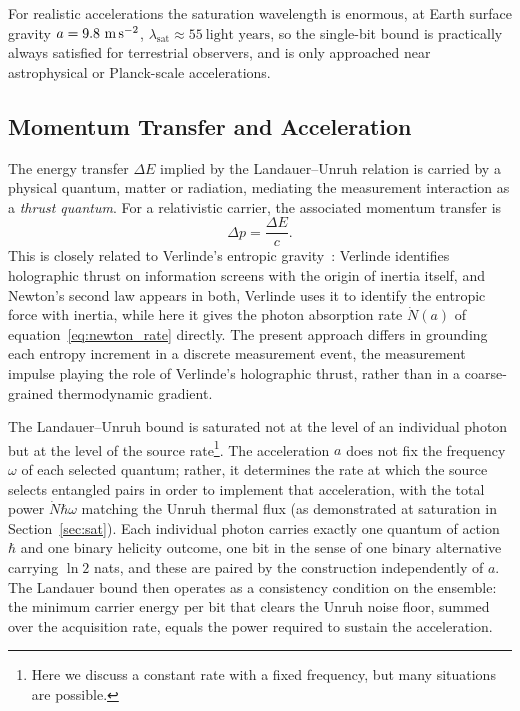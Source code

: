 \documentclass[12pt,a4paper]{article}
\begin{document}
For realistic accelerations the saturation wavelength is 
enormous, at Earth surface gravity $a = 9.8\ 
\text{m\,s}^{-2}$, $\lambda_{\text{sat}} \approx 55\ 
\text{light years}$, so the single-bit bound is 
practically always satisfied for terrestrial observers, 
and is only approached near astrophysical or Planck-scale 
accelerations.

\subsection{Momentum Transfer and Acceleration}
\label{sec:momentum}

The energy transfer $\Delta E$ implied by the 
Landauer--Unruh relation is carried by a physical 
quantum, matter or radiation, mediating the measurement 
interaction as a \emph{thrust quantum}. For a 
relativistic carrier, the associated momentum transfer is
%
\begin{equation}
\Delta p = \frac{\Delta E}{c}.
\end{equation}
%
This is closely related to Verlinde's entropic 
gravity~\cite{entropic}: Verlinde identifies holographic 
thrust on information screens with the origin of inertia 
itself, and Newton's second law appears in both,
Verlinde uses it to identify the entropic force with inertia, 
while here it gives the photon absorption rate 
$\dot{N}(a)$ of equation~\eqref{eq:newton_rate} directly.
The present approach differs in grounding 
each entropy increment in a discrete measurement event, 
the measurement impulse playing the role of Verlinde's 
holographic thrust, rather than in a coarse-grained 
thermodynamic gradient.

The Landauer--Unruh bound is saturated not at the level 
of an individual photon but at the level of the source 
rate\footnote{Here we discuss a constant rate with a 
fixed frequency, but many situations are possible.}. 
The acceleration $a$ does not fix the frequency $\omega$ 
of each selected quantum; rather, it determines the rate 
at which the source selects entangled pairs in order to 
implement that acceleration,
with the total power 
$\dot{N}\hbar\omega$ matching the Unruh thermal flux 
(as demonstrated at saturation in Section~\ref{sec:sat}).
Each individual photon carries exactly one quantum of 
action $\hbar$ and one binary helicity outcome, one bit 
in the sense of one binary alternative carrying 
$\ln 2$ nats, and these are paired by the construction 
independently of $a$. The Landauer bound then operates 
as a consistency condition on the ensemble:
the minimum carrier energy per bit that clears the Unruh 
noise floor, summed over the acquisition rate,
equals the power required to sustain the acceleration.
\end{document}
